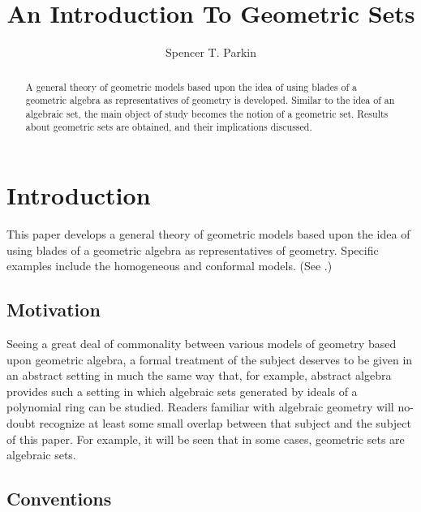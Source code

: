 \documentclass{birkjour}
\theoremstyle{definition}
\theoremstyle{remark}
\numberwithin{equation}{section}
\begin{document}
\title{An Introduction To Geometric Sets}

\author{Spencer T. Parkin}
\address{102 W. 500 S., \\
Salt Lake City, UT  84101} 



\begin{abstract}
A general theory of geometric models based upon the idea of using blades of a geometric algebra
as representatives of geometry is developed.  Similar to the idea of an algebraic set, the main object of study
becomes the notion of a geometric set.  Results about geometric sets are obtained, and their implications discussed.
\end{abstract}


\maketitle

\section{Introduction}

This paper develops a general theory of geometric models
based upon the idea of using blades of a geometric algebra as representatives of geometry.
Specific examples include the homogeneous and conformal models.  (See \cite{}.)

\subsection{Motivation}

Seeing a great deal of commonality between various models of geometry based upon
geometric algebra, a formal treatment of the subject deserves to be given in an abstract
setting in much the same way that, for example, abstract algebra provides such a setting
in which algebraic sets generated by ideals of a polynomial ring can be studied.
Readers familiar with algebraic geometry will no-doubt recognize at least some small overlap
between that subject and the subject of this paper.  For example, it will be seen
that in some cases, geometric sets are algebraic sets.

\subsection{Conventions}
\end{document}
